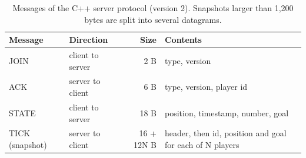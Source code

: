 \documentclass[11pt]{article}
\begin{document}

\begin{table}[H]
\centering
\small
\begin{tabular}{@{}llrl@{}}
\toprule
Message & Direction & Size & Contents \\
\midrule
JOIN & client to server & 2 B & type, version \\
ACK & server to client & 6 B & type, version, player id \\
STATE & client to server & 18 B & position, timestamp, number, goal \\
TICK (snapshot) & server to client & 16 + 12N B & header, then id, position and goal for each of N players \\
\bottomrule
\end{tabular}
\caption{Messages of the C++ server protocol (version 2). Snapshots larger than 1,200 bytes are split into several datagrams.}
\label{tab:packets}
\end{table}
\end{document}
